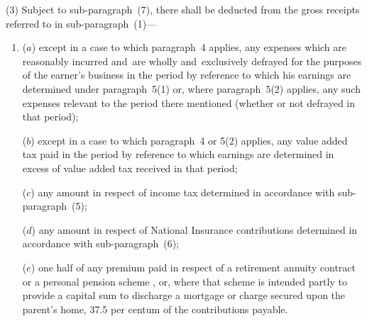 \documentclass[12pt,a4paper]{article}
\begin{document}
(3) 
Subject to sub-paragraph~(7), %
there shall be deducted from the gross receipts referred to in sub-paragraph~(1)—
\begin{enumerate}\item[]
($a$) 
except in a case to which paragraph~4 applies, %
any expenses which are reasonably incurred and~are wholly and~exclusively defrayed for the purposes of the earner’s business in the period by reference to which his earnings are determined under paragraph~5(1) or, where paragraph~5(2) applies, any such expenses relevant to the period there mentioned (whether or not defrayed in that period);

($b$) 
except in a case to which paragraph~4 
  or 5(2)  %
applies, %
any value added tax paid in the period by reference to which earnings are determined in excess of value added tax received in that period;

($c$) any amount in respect of income tax determined in accordance with sub-paragraph~(5);

($d$) any amount in respect of National Insurance contributions determined in accordance with sub-paragraph~(6);

($e$) one half of any premium paid in respect of a retirement annuity contract or a personal pension scheme%
, or, where that scheme is intended partly to provide a capital sum to discharge a mortgage or charge secured upon the parent’s home, 37$.$5 per centum of the contributions payable. %
\end{enumerate}
\end{document}
